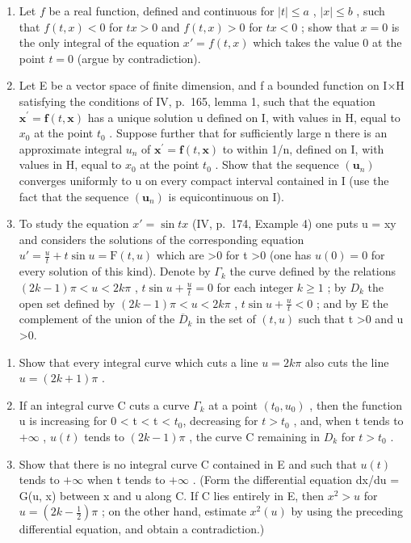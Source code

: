 \begin{enumerate}
\def\labelenumi{\arabic{enumi})}
\setcounter{enumi}{14}
\item
  Let \(f\) be a real function, defined and continuous for \(|t| \leqslant a\) , \(|x| \leqslant b\) , such that \(f(t,x) < 0\) for \(tx > 0\) and \(f(t,x) > 0\) for \(tx < 0\) ; show that \(x = 0\) is the only integral of the equation \(x' = f(t,x)\) which takes the value 0 at the point \(t = 0\) (argue by contradiction).
\item
  Let E be a vector space of finite dimension, and f a bounded function on I×H satisfying the conditions of IV, p.~165, lemma 1, such that the equation \(\mathbf{x}^{\prime}=\mathbf{f}(t,\mathbf{x})\) has a unique solution u defined on I, with values in H, equal to \(x_{0}\) at the point \(t_{0}\) . Suppose further that for sufficiently large n there is an approximate integral \(u_{n}\) of \(\mathbf{x}^{\prime}=\mathbf{f}(t,\mathbf{x})\) to within 1/n, defined on I, with values in H, equal to \(x_{0}\) at the point \(t_{0}\) . Show that the sequence \((\mathbf{u}_{n})\) converges uniformly to u on every compact interval contained in I (use the fact that the sequence \((\mathbf{u}_{n})\) is equicontinuous on I).
\item
  To study the equation \(x' = \sin tx\) (IV, p.~174, Example 4) one puts u = xy and considers the solutions of the corresponding equation \(u' = \frac{u}{t} + t \sin u = \mathrm{F}(t, u)\) which are \textgreater0 for t \textgreater0 (one has \(u(0) = 0\) for every solution of this kind). Denote by \(\Gamma_k\) the curve defined by the relations \((2k - 1)\pi < u < 2k\pi\) , \(t \sin u + \frac{u}{t} = 0\) for each integer \(k \geqslant 1\) ; by \(D_k\) the open set defined by \((2k - 1)\pi < u < 2k\pi\) , \(t \sin u + \frac{u}{t} < 0\) ; and by E the complement of the union of the \(\overline{D}_k\) in the set of \((t, u)\) such that t \textgreater0 and u \textgreater0.
\end{enumerate}

\begin{enumerate}
\def\labelenumi{\alph{enumi})}
\item
  Show that every integral curve which cuts a line \(u = 2k\pi\) also cuts the line \(u = (2k + 1)\pi\) .
\item
  If an integral curve C cuts a curve \(\Gamma_{k}\) at a point \((t_{0}, u_{0})\) , then the function u is increasing for 0 \textless{} t \textless{} t \textless{} \(t_{0}\), decreasing for \(t > t_{0}\) , and, when t tends to \(+\infty\) , \(u(t)\) tends to \((2k - 1)\pi\) , the curve C remaining in \(D_{k}\) for \(t > t_{0}\) .
\item
  Show that there is no integral curve C contained in E and such that \(u(t)\) tends to \(+\infty\) when t tends to \(+\infty\) . (Form the differential equation dx/du = G(u, x) between x and u along C. If C lies entirely in E, then \(x^{2} > u\) for \(u = (2k - \frac{1}{2})\pi\) ; on the other hand, estimate \(x^{2}(u)\) by using the preceding differential equation, and obtain a contradiction.)
\end{enumerate}

